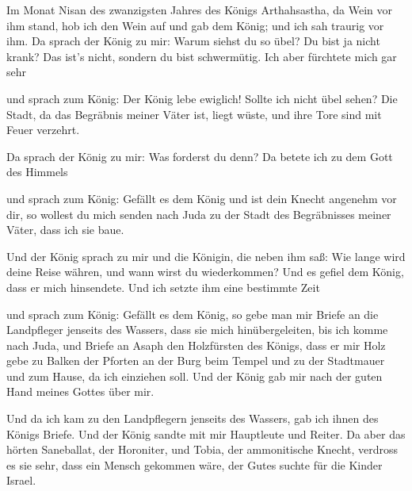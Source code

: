  Im Monat Nisan des zwanzigsten Jahres des Königs
Arthahsastha, da Wein vor ihm stand, hob ich den Wein auf und gab dem
König; und ich sah traurig vor ihm.  Da sprach der König
zu mir: Warum siehst du so übel? Du bist ja nicht krank? Das ist's
nicht, sondern du bist schwermütig. Ich aber fürchtete mich gar sehr

 und sprach zum König: Der König lebe ewiglich! Sollte ich
nicht übel sehen? Die Stadt, da das Begräbnis meiner Väter ist, liegt
wüste, und ihre Tore sind mit Feuer verzehrt.

 Da sprach der König zu mir: Was forderst du denn? Da
betete ich zu dem Gott des Himmels

 und sprach zum König: Gefällt es dem König und ist dein
Knecht angenehm vor dir, so wollest du mich senden nach Juda zu der
Stadt des Begräbnisses meiner Väter, dass ich sie baue.

 Und der König sprach zu mir und die Königin, die neben
ihm saß: Wie lange wird deine Reise währen, und wann wirst du
wiederkommen? Und es gefiel dem König, dass er mich hinsendete. Und ich
setzte ihm eine bestimmte Zeit

 und sprach zum König: Gefällt es dem König, so gebe man
mir Briefe an die Landpfleger jenseits des Wassers, dass sie mich
hinübergeleiten, bis ich komme nach Juda,  und Briefe an
Asaph den Holzfürsten des Königs, dass er mir Holz gebe zu Balken der
Pforten an der Burg beim Tempel und zu der Stadtmauer und zum Hause, da
ich einziehen soll. Und der König gab mir nach der guten Hand meines
Gottes über mir.

 Und da ich kam zu den Landpflegern jenseits des Wassers,
gab ich ihnen des Königs Briefe. Und der König sandte mit mir Hauptleute
und Reiter.  Da aber das hörten Saneballat, der
Horoniter, und Tobia, der ammonitische Knecht, verdross es sie sehr,
dass ein Mensch gekommen wäre, der Gutes suchte für die Kinder Israel.

